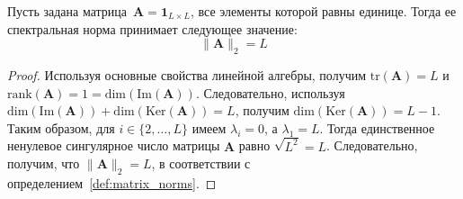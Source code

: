 \begin{lemma}\label{lemma:1_spectral_norm}
    Пусть задана матрица~$\mathbf{A} = \mathbf{1}_{L \times L}$, все элементы которой равны единице. Тогда ее спектральная норма принимает следующее значение:
    \begin{equation}
        \|\mathbf{A}\|_2 = L
    \end{equation}
\end{lemma}
\begin{proof}
    Используя основные свойства линейной алгебры, получим $\mathrm{tr}(\mathbf{A}) = L$ и $\mathrm{rank}(\mathbf{A}) = 1 = \mathrm{dim}(\mathrm{Im}(\mathbf{A}))$.
    Следовательно, используя $\mathrm{dim}(\mathrm{Im}(\mathbf{A})) + \mathrm{dim}(\mathrm{Ker}(\mathbf{A})) = L$, получим $\mathrm{dim}(\mathrm{Ker}(\mathbf{A})) = L - 1$.
    Таким образом, для $i \in \{2, \dots, L\}$ имеем $\lambda_i = 0$, а $\lambda_1 = L$.
    Тогда единственное ненулевое сингулярное число матрицы $\mathbf{A}$ равно $\sqrt{L^2} = L$.
    Следовательно, получим, что $\|\mathbf{A}\|_2 = L$, в соответствии с определением~\ref{def:matrix_norms}.
\end{proof}